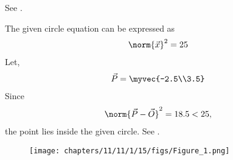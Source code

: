 See 
.
\begin{table}[H]
\begin{center}

\end{center}
\caption{}
\label{tab:chapters/11/11/1/15/}
\end{table}
The given circle equation can be expressed as
\begin{align}
	\norm{\vec{x}}^2= 25
\end{align}
Let,
\begin{align}
	\vec{P}=\myvec{-2.5\\3.5}
\end{align}
Since
\begin{align}
	\norm{\vec{P} - \vec{O}}^2 =
 18.5 < 25,
\end{align}
the point lies inside the given circle.
See 
    .
\begin{figure}[H]
  \centering
    \texttt{[image: chapters/11/11/1/15/figs/Figure\_1.png]}
    \caption{}
    \label{fig:chapters/11/11/1/15/}
\end{figure}
